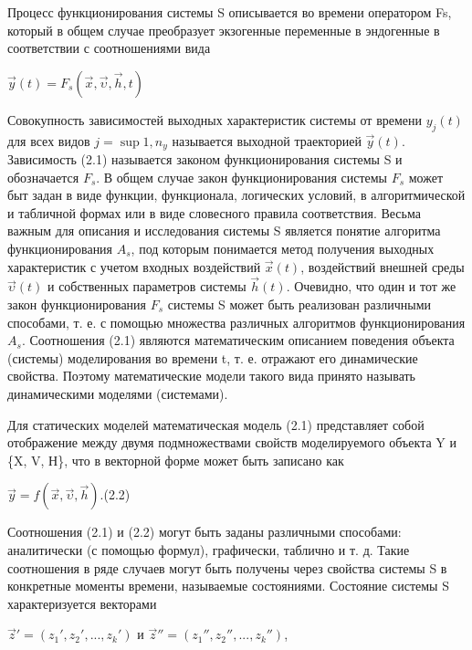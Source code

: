   Процесс функционирования системы S описывается во времени оператором Fs, который в общем случае преобразует экзогенные переменные в эндогенные в соответствии с соотношениями вида

  \begin{center}
    $\vec{y}(t) = F_{s}(\vec{x}, \vec{\upsilon}, \vec{h}, t)$
  \end{center}

  Совокупность зависимостей выходных характеристик системы от времени $y_{j}(t)$ для всех видов $j = \sup{1, n_{y}}$ называется выходной траекторией $\vec{y}(t)$. Зависимость (2.1) называется законом функционирования системы S и обозначается $F_{s}$. В общем случае закон функционирования системы $F_{s}$ может быт задан в виде функции, функционала, логических условий, в алгоритмической и табличной формах или в виде словесного правила соответствия. Весьма важным для описания и исследования системы S является понятие алгоритма функционирования $A_{s}$, под которым понимается метод получения выходных характеристик с учетом входных воздействий $\vec{x}(t)$, воздействий внешней среды $\vec{\upsilon}(t)$ и собственных параметров системы $\vec{h}(t)$. Очевидно, что один и тот же закон функционирования $F_{s}$ системы S может быть реализован различными способами, т. е. с помощью множества различных алгоритмов функционирования $A_{s}$. Соотношения (2.1) являются математическим описанием поведения объекта (системы) моделирования во времени t, т. е. отражают его динамические свойства. Поэтому математические модели такого вида принято называть динамическими моделями (системами).

  Для статических моделей математическая модель (2.1) представляет собой отображение между двумя подмножествами свойств моделируемого объекта Y и \{X, V, Н\}, что в векторной форме может быть записано как

  \begin{center}
      $\vec{y} = f(\vec{x}, \vec{\upsilon}, \vec{h})$.(2.2)
  \end{center}

  Соотношения (2.1) и (2.2) могут быть заданы различными способами: аналитически (с помощью формул), графически, таблично и т. д. Такие соотношения в ряде случаев могут быть получены через свойства системы S в конкретные моменты времени, называемые состояниями. Состояние системы S характеризуется векторами

  \begin{center}
    $\vec{z}' = (z_{1}', z_{2}', ... , z_{k}')$ и $\vec{z}'' = (z_{1}'', z_{2}'', ... , z_{k}'')$,
  \end{center}


